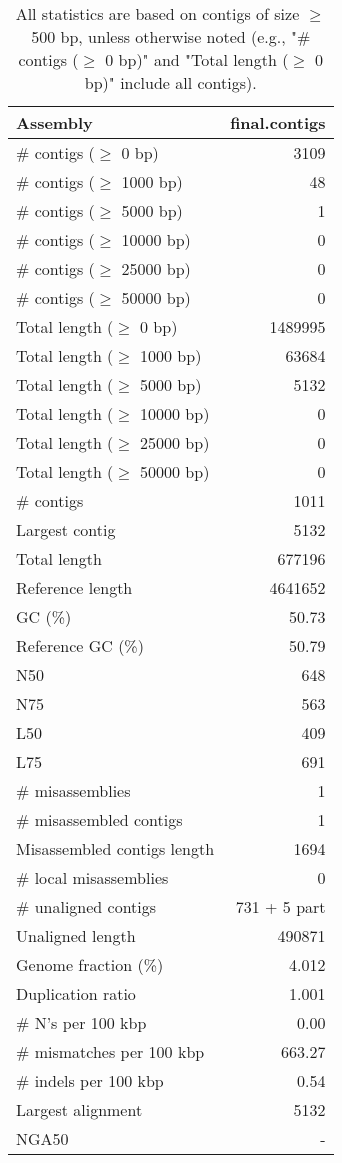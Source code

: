 \documentclass[12pt,a4paper]{article}
\begin{document}
\begin{table}[ht]
\begin{center}
\caption{All statistics are based on contigs of size $\geq$ 500 bp, unless otherwise noted (e.g., "\# contigs ($\geq$ 0 bp)" and "Total length ($\geq$ 0 bp)" include all contigs).}
\begin{tabular}{|l*{1}{|r}|}
\hline
Assembly & final.contigs \\ \hline
\# contigs ($\geq$ 0 bp) & 3109 \\ \hline
\# contigs ($\geq$ 1000 bp) & 48 \\ \hline
\# contigs ($\geq$ 5000 bp) & 1 \\ \hline
\# contigs ($\geq$ 10000 bp) & 0 \\ \hline
\# contigs ($\geq$ 25000 bp) & 0 \\ \hline
\# contigs ($\geq$ 50000 bp) & 0 \\ \hline
Total length ($\geq$ 0 bp) & 1489995 \\ \hline
Total length ($\geq$ 1000 bp) & 63684 \\ \hline
Total length ($\geq$ 5000 bp) & 5132 \\ \hline
Total length ($\geq$ 10000 bp) & 0 \\ \hline
Total length ($\geq$ 25000 bp) & 0 \\ \hline
Total length ($\geq$ 50000 bp) & 0 \\ \hline
\# contigs & 1011 \\ \hline
Largest contig & 5132 \\ \hline
Total length & 677196 \\ \hline
Reference length & 4641652 \\ \hline
GC (\%) & 50.73 \\ \hline
Reference GC (\%) & 50.79 \\ \hline
N50 & 648 \\ \hline
N75 & 563 \\ \hline
L50 & 409 \\ \hline
L75 & 691 \\ \hline
\# misassemblies & 1 \\ \hline
\# misassembled contigs & 1 \\ \hline
Misassembled contigs length & 1694 \\ \hline
\# local misassemblies & 0 \\ \hline
\# unaligned contigs & 731 + 5 part \\ \hline
Unaligned length & 490871 \\ \hline
Genome fraction (\%) & 4.012 \\ \hline
Duplication ratio & 1.001 \\ \hline
\# N's per 100 kbp & 0.00 \\ \hline
\# mismatches per 100 kbp & 663.27 \\ \hline
\# indels per 100 kbp & 0.54 \\ \hline
Largest alignment & 5132 \\ \hline
NGA50 & - \\ \hline
\end{tabular}
\end{center}
\end{table}
\end{document}
